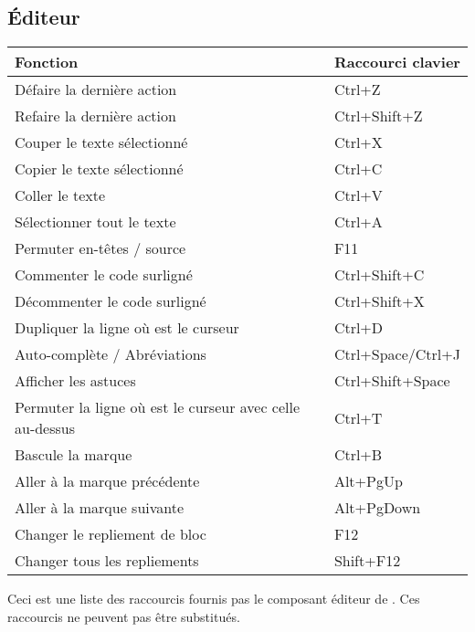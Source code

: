 \subsection{Éditeur}

\begin{tabular}{|l|l|}\hline
Fonction		                &	Raccourci clavier\\ \hline
Défaire la dernière action 	    &	Ctrl+Z\\ \hline
Refaire la dernière action 	    &	Ctrl+Shift+Z\\ \hline
Couper le texte sélectionné     &   Ctrl+X\\ \hline
Copier le texte sélectionné     &   Ctrl+C\\ \hline
Coller le texte                 &   Ctrl+V\\ \hline
Sélectionner tout le texte      &   Ctrl+A\\ \hline
Permuter en-têtes / source 	    &	F11\\ \hline
Commenter le code surligné      &	Ctrl+Shift+C\\ \hline
Décommenter le code surligné    & 	Ctrl+Shift+X\\ \hline
Dupliquer la ligne où est le curseur      & 	Ctrl+D\\ \hline
Auto-complète / Abréviations    & 	Ctrl+Space/Ctrl+J\\ \hline
Afficher les astuces            &	Ctrl+Shift+Space\\ \hline
Permuter la ligne où est le curseur avec celle au-dessus    &	Ctrl+T\\ \hline
Bascule la marque 	            &	Ctrl+B\\ \hline
Aller à la marque précédente 	&	Alt+PgUp\\ \hline
Aller à la marque suivante  	&	Alt+PgDown\\ \hline
Changer le repliement de bloc 	&	F12\\ \hline
Changer tous les repliements    &	Shift+F12\\ \hline
\end{tabular}

Ceci est une liste des raccourcis fournis pas le composant éditeur de \codeblocks. Ces raccourcis ne peuvent pas être substitués.

